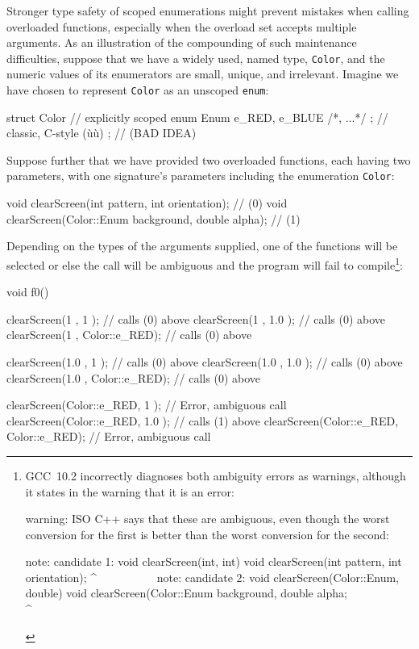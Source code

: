 Stronger type safety of scoped enumerations might prevent mistakes when calling overloaded functions, especially when the overload set accepts multiple arguments. As an illustration of the compounding of such maintenance
difficulties, suppose that we have a widely used, named type,
\lstinline!Color!, and the numeric values of its enumerators are small,
unique, and irrelevant. Imagine we have chosen to represent
\lstinline!Color! as an unscoped \lstinline!enum!:

\begin{emcppslisting}[emcppsbatch=e7]
struct Color
{                                           // explicitly scoped
    enum Enum { e_RED, e_BLUE /*, ...*/ };  // classic, C-style (ù{}ù)
};                                          // (BAD IDEA)
\end{emcppslisting}

\noindent Suppose further that we have provided two overloaded functions, each
having two parameters, with one signature's parameters including the
enumeration \lstinline!Color!:

\begin{emcppslisting}[emcppsbatch=e7]
void clearScreen(int pattern, int orientation);          // (0)
void clearScreen(Color::Enum background, double alpha);  // (1)
\end{emcppslisting}

\noindent Depending on the types of the arguments supplied, one of the 
functions will be selected or else the call will be ambiguous and the
program will fail to compile{\cprotect\footnote{GCC~10.2 incorrectly diagnoses both ambiguity errors as warnings, although it
states in the warning that it is an error:

\begin{emcppslisting}[language=bash,style=footcodeplain]
warning: ISO C++ says that these are ambiguous, even though the worst conversion for the
         first is better than the worst conversion for the second:

note: candidate 1: void clearScreen(int, int)
void clearScreen(int pattern, int orientation);
     ^~~~~~~~~~~
note: candidate 2: void clearScreen(Color::Enum, double)
void clearScreen(Color::Enum background, double alpha;
     ^~~~~~~~~~~
\end{emcppslisting}
      }}:

\begin{emcppslisting}[emcppsbatch=e7]
void f0()
{
    clearScreen(1           , 1           );  // calls (0) above
    clearScreen(1           , 1.0         );  // calls (0) above
    clearScreen(1           , Color::e_RED);  // calls (0) above

    clearScreen(1.0         , 1           );  // calls (0) above
    clearScreen(1.0         , 1.0         );  // calls (0) above
    clearScreen(1.0         , Color::e_RED);  // calls (0) above

    clearScreen(Color::e_RED, 1           );  // Error, ambiguous call
    clearScreen(Color::e_RED, 1.0         );  // calls (1) above
    clearScreen(Color::e_RED, Color::e_RED);  // Error, ambiguous call
}
\end{emcppslisting}

